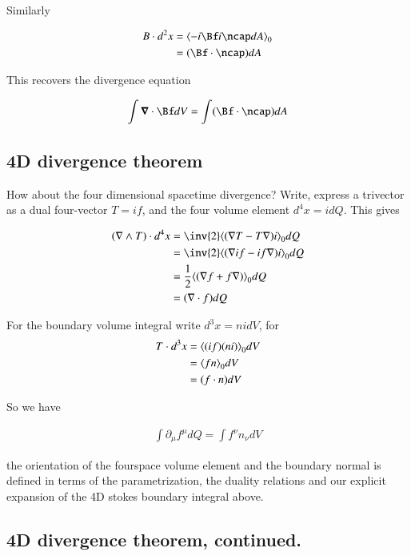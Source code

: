 Similarly

\begin{align*}
B \cdot d^2 x
&=
\gpgradezero{ 
-i\Bf i \ncap dA
} \\
&=
(\Bf \cdot \ncap) dA
 \\
\end{align*}

This recovers the  divergence equation

\begin{align}
\int \spacegrad \cdot \Bf dV = \int (\Bf \cdot \ncap) dA
\end{align}

\subsection{4D divergence theorem}

How about the four dimensional spacetime divergence?  Write, express a trivector as a dual four-vector $T = if$, and the four volume element $d^4 x = i dQ$.  This gives

\begin{align*}
(\grad \wedge T) \cdot d^4 x
&=
\inv{2} \gpgradezero{ (\grad T - T \grad) i } dQ \\
&=
\inv{2} \gpgradezero{ (\grad i f - if \grad) i } dQ \\
&=
\frac{1}{2} \gpgradezero{ (\grad f + f \grad) } dQ \\
&=
(\grad \cdot f) dQ
\end{align*}

For the boundary volume integral write $d^3 x = n i dV$, for
\begin{align*}
T \cdot d^3 x 
&= 
{\left\langle{{ (if) ( n i ) }}\right\rangle}_{0} dV \\
&= 
{\left\langle{{ f n }}\right\rangle}_{0} dV \\
&= 
(f \cdot n) dV
\end{align*}

So we have

\begin{align*}
\int \partial_\mu f^\mu dQ = \int f^\nu n_\nu dV
\end{align*}

the orientation of the fourspace volume element and the boundary normal is defined in terms of the parametrization, the duality relations and our explicit expansion of the 4D stokes boundary integral above.

\subsection{4D divergence theorem, continued.}

